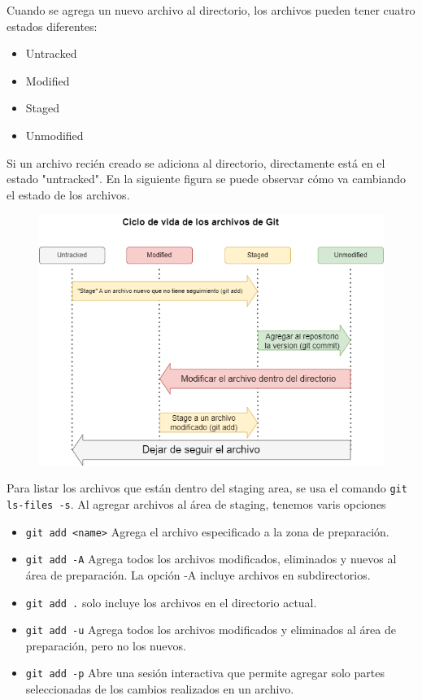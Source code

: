 Cuando se agrega un nuevo archivo al directorio, los archivos pueden tener cuatro estados diferentes:
\begin{itemize}
    \item Untracked
    \item Modified
    \item Staged
    \item Unmodified
\end{itemize}


Si un archivo recién creado se adiciona al directorio, directamente está en el estado "untracked". En la siguiente figura se puede observar cómo va cambiando el estado de los archivos.


\begin{figure}[H]
    \centering
    \includegraphics[scale=0.65]{Github/Git_f5.png}
\end{figure}

Para listar los archivos que están dentro del staging area, se usa el comando \texttt{git ls-files -s}. Al agregar archivos al área de staging, tenemos varis opciones

\begin{itemize}
    \item \texttt{git add <name>} Agrega el archivo especificado a la zona de preparación.
    \item \texttt{git add -A} Agrega todos los archivos modificados, eliminados y nuevos al área de preparación. La opción -A incluye archivos en subdirectorios.
    \item \texttt{git add .} solo incluye los archivos en el directorio actual.
    \item \texttt{git add -u} Agrega todos los archivos modificados y eliminados al área de preparación, pero no los nuevos.
    \item \texttt{git add -p} Abre una sesión interactiva que permite agregar solo partes seleccionadas de los cambios realizados en un archivo.
\end{itemize}

